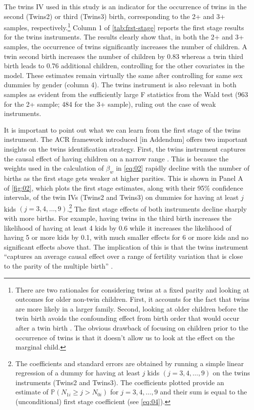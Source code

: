 The twins IV used in this study is an indicator for the occurrence of twins in the second (Twins2) or third (Twins3) birth, corresponding to the 2+ and 3+ samples, respectively.\footnote{There are two rationales for considering twins at a fixed parity and looking at outcomes for older non-twin children. First, it accounts for the fact that twins are more likely in a larger family. Second, looking at older children before the twin birth avoids the confounding effect from birth order that would occur after a twin birth \parencite{Black2010}. The obvious drawback of focusing on children prior to the occurrence of twins is that it doesn't allow us to look at the effect on the marginal child.} Column 1 of \autoref{tab:frst-stage} reports the first stage results for the twins instruments. The results clearly show that, in both the 2+ and 3+ samples, the occurrence of twins significantly increases the number of children. A twin second birth increases the number of children by 0.83 whereas a twin third birth leads to 0.76 additional children, controlling for the other covariates in the model. These estimates remain virtually the same after controlling for same sex dummies by gender (column 4).  The twins instrument is also relevant in both samples as evident from the sufficiently large F statistics from the Wald test (963 for the 2+ sample; 484 for the 3+ sample), ruling out the case of weak instruments.

 
% 

It is important to point out what we can learn from the first stage of the twins instrument. The ACR framework introduced [in Addendum] offers two important insights on the twins identification strategy. First, the twins instrument captures the causal effect of having children on a narrow range \parencite{angrist_multiple_2010}. This is because the weights used in the calculation of $ \beta_{w} $ in \eqref{eq:02} rapidly decline with the number of births as the first stage gets weaker at higher parities. This is shown in Panel A of \autoref{fig:02}, which plots the first stage estimates, along with their 95\% confidence intervals, of the twin IVs (Twins2 and Twins3) on dummies for having at least $ j $ kids $ (j = 3, 4, \dots, 9) $.\footnote{ The coefficients and standard errors are obtained by running a simple linear regression of a dummy for having at least $ j $ kids $ (j = 3, 4, \dots, 9) $ on the twins instruments (Twins2 and Twins3). The coefficients plotted provide an estimate of $ \mathbb{P}(N_{1i} \geq j > N_{0i}) $ for $ j = 3, 4, \dots, 9 $ and their sum is equal to the (unconditional) first stage coefficient (see \eqref{eq:04}). } The first stage effects of both instruments decline sharply with more births. For example, having twins in the third birth increases the likelihood of having at least 4 kids by 0.6 while it increases the likelihood of having 5 or more kids by 0.1, with much smaller effects for 6 or more kids and no significant effects above that.  The implication of this is that the twins instrument \enquote{captures an average causal effect over a range of fertility variation that is close to the parity of the multiple birth} \parencite[p.~788]{angrist_multiple_2010}. 

